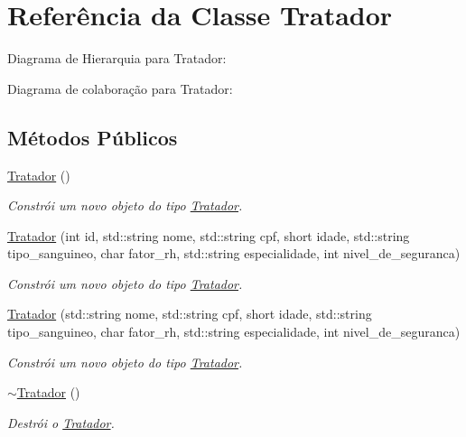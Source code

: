 \hypertarget{classTratador}{}\section{Referência da Classe Tratador}
\label{classTratador}


Diagrama de Hierarquia para Tratador\+:


Diagrama de colaboração para Tratador\+:
\subsection*{Métodos Públicos}
\begin{DoxyCompactItemize}
\item 
\mbox{\label{classTratador_a4339bfc1e32968609401440338eeba20}} 
\hyperlink{classTratador_a4339bfc1e32968609401440338eeba20}{Tratador} ()
\begin{DoxyCompactList}\small\item\em Constrói um novo objeto do tipo \hyperlink{classTratador}{Tratador}. \end{DoxyCompactList}\item 
\hyperlink{classTratador_ae7448911b01efadf4b7e0a1a34a47bdc}{Tratador} (int id, std\+::string nome, std\+::string cpf, short idade, std\+::string tipo\+\_\+sanguineo, char fator\+\_\+rh, std\+::string especialidade, int nivel\+\_\+de\+\_\+seguranca)
\begin{DoxyCompactList}\small\item\em Constrói um novo objeto do tipo \hyperlink{classTratador}{Tratador}. \end{DoxyCompactList}\item 
\hyperlink{classTratador_a6b4883b6a6fe42fd6f502fd2a655d435}{Tratador} (std\+::string nome, std\+::string cpf, short idade, std\+::string tipo\+\_\+sanguineo, char fator\+\_\+rh, std\+::string especialidade, int nivel\+\_\+de\+\_\+seguranca)
\begin{DoxyCompactList}\small\item\em Constrói um novo objeto do tipo \hyperlink{classTratador}{Tratador}. \end{DoxyCompactList}\item 
\mbox{\label{classTratador_a8750ed6960e786da5d6f87e05b491093}} 
\hyperlink{classTratador_a8750ed6960e786da5d6f87e05b491093}{$\sim$\+Tratador} ()
\begin{DoxyCompactList}\small\item\em Destrói o \hyperlink{classTratador}{Tratador}. \end{DoxyCompactList}\item 

\end{DoxyCompactItemize}
